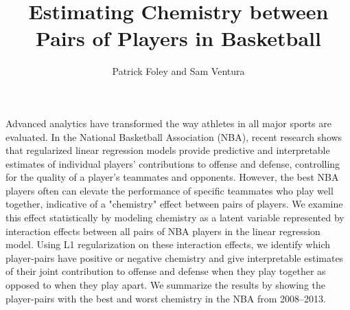 \documentclass{article}
\author{Patrick Foley and Sam Ventura}
\title{Estimating Chemistry between Pairs of Players in Basketball}
\begin{document}
\maketitle{}

Advanced analytics have transformed the way athletes in all major sports are evaluated.  In the National Basketball Association (NBA), recent research shows that regularized linear regression models provide predictive and interpretable estimates of individual players' contributions to offense and defense, controlling for the quality of a player's teammates and opponents.  However, the best NBA players often can elevate the performance of specific teammates who play well together, indicative of a "chemistry" effect between pairs of players.  We examine this effect statistically by modeling chemistry as a latent variable represented by interaction effects between all pairs of NBA players in the linear regression model.  Using L1 regularization on these interaction effects, we identify which player-pairs have positive or negative chemistry and give interpretable estimates of their joint contribution to offense and defense when they play together as opposed to when they play apart.  We summarize the results by showing the player-pairs with the best and worst chemistry in the NBA from 2008--2013.  
\end{document}
